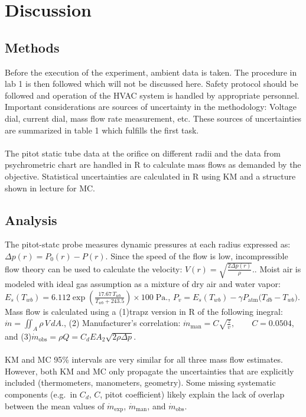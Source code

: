 \documentclass[11pt]{article}
\begin{document}
\section{Discussion}
\subsection*{Methods}
Before the execution of the experiment, ambient data is taken. The procedure in lab 1 is then followed which will not be discussed here.
Safety protocol should be followed and operation of the HVAC system is handled by appropriate personnel.
Important considerations are sources of uncertainty in the methodology: Voltage dial, current dial, mass flow rate measurement, etc.
These sources of uncertainties are summarized in table 1 which fulfills the first task.
\\~\\
The pitot static tube data at the orifice on different radii and the data from psychrometric chart are handled in R to calculate mass flows
as demanded by the objective. Statistical uncertainties are calculated in R using KM and a structure shown in lecture for MC.


\subsection*{Analysis}
The pitot-statc probe measures dynamic pressures at each radius expressed as: $ \Delta p(r) = P_0(r) - P(r) $.
Since the speed of the flow is low, incompressible flow theory can be used to calculate the velocity: $
           V(r) = \sqrt{\frac{2 \Delta p(r)}{\rho}}. $. Moist air is modeled with ideal gas assumption as a mixture of dry air and water vapor: $ E_s(T_{wb}) = 6.112
                   \exp\!\left(
                     \frac{17.67\,T_{wb}}{T_{wb} + 243.5}
                   \right) \times 100
                   \; \text{Pa}. $, $ P_v = E_s(T_{wb}) -
                   \gamma P_{\text{atm}}
                   \bigl(T_{db} - T_{wb}\bigr) $.
Mass flow is calculated using a (1)trapz version in R of the following inegral: $ \dot m = \iint_A \rho\,V\,dA. $,
(2) Manufacturer's correlation: $ \dot m_{\text{man}} = C \sqrt{\frac{z}{v}},
           \qquad C = 0.0504 $, and 
(3)$ \dot m_{\text{obs}} = \rho Q
           = C_d E A_2 \sqrt{2\rho \Delta p}. $
\\~\\
KM and MC 95\% intervals are very similar for all three mass flow
estimates. However, both KM and MC only propagate the uncertainties that are
explicitly included (thermometers, manometers, geometry). Some missing
systematic components (e.g.\ in \(C_d\), \(C\), pitot coefficient)
likely explain the lack of overlap between the mean values of
\( \dot m_{\text{exp}} \), \( \dot m_{\text{man}} \), and
\( \dot m_{\text{obs}} \).
\end{document}
